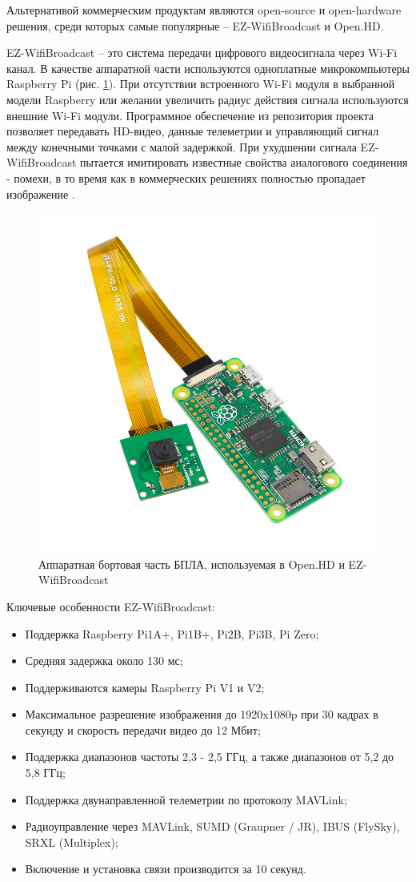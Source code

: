 Альтернативой коммерческим продуктам являются open-source и open-hardware решения, среди которых самые популярные -- EZ-Wi\-fi\-Broadcast и Open.HD.

EZ-WifiBroadcast -- это система передачи цифрового видеосигнала через Wi-Fi канал. В качестве аппаратной части используются одноплатные микрокомпьютеры Raspberry Pi (рис. \ref{fig:openhd}). При отсутствии встроенного Wi-Fi модуля в выбранной модели Raspberry или желании увеличить радиус действия сигнала используются внешние Wi-Fi модули. Программное обеспечение из репозитория проекта позволяет передавать HD-видео, данные телеметрии и управляющий сигнал между конечными точками с малой задержкой. При ухудшении сигнала EZ-WifiBroadcast пытается имитировать известные свойства аналогового соединения - помехи, в то время как в коммерческих решениях полностью пропадает изображение \cite{EZ}.

\begin{figure}[H]
	\centering
	\includegraphics[width=0.5\linewidth]{pics/openhd}
	\caption{ Аппаратная бортовая часть БПЛА, используемая в Open.HD и EZ-WifiBroadcast
	}
	\label{fig:openhd}
\end{figure}

Ключевые особенности EZ-WifiBroadcast:
\begin{itemize}
	\item Поддержка Raspberry Pi1A+, Pi1B+, Pi2B, Pi3B, Pi Zero;
	\item Средняя задержка около 130 мс;
	\item Поддерживаются камеры Raspberry Pi V1 и V2;
	\item Максимальное разрешение изображения до 1920x1080p при 30 кадрах в секунду и скорость передачи видео до 12 Мбит;
	\item Поддержка диапазонов частоты 2,3 - 2,5 ГГц, а также диапазонов от 5,2 до 5,8 ГГц;
	\item Поддержка двунаправленной телеметрии по протоколу MAVLink;
	\item Радиоуправление через MAVLink, SUMD (Graupner / JR), IBUS (FlySky), SRXL (Multiplex);
	\item Включение и установка связи производится за 10 секунд.
\end{itemize}

